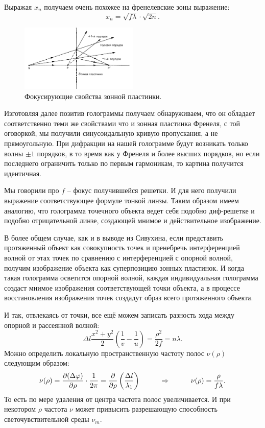 Выражая $x_n$ получаем очень похожее на френелевские зоны выражение:
 \begin{equation*}
 	x_n = \sqrt{f \lambda} \cdot \sqrt{2 n}.
 \end{equation*}

 \begin{figure}
     \centering
     \includegraphics[width=0.5\textwidth]{figures/vosstan_gabor.png}
     \caption{Фокусирующие свойства зонной пластинки.}
 \end{figure}
 Изготовляя далее позитив голограммы получаем обнаруживаем, что он обладает соответственно теми же свойствами что и зонная пластинка Френеля, с той оговоркой, мы получили синусоидальную кривую пропускания, а не прямоугольную. При дифракции на нашей голограмме будут возникать только волны $\pm 1$ порядков, в то время как у Френеля и более высших порядков, но если последнего ограничить только по первым гармоникам, то картина получится идентичная.

 Мы говорили про $f$ -- фокус получившейся решетки. И для него получили выражение соответствующее формуле тонкой линзы.
 Таким образом имеем аналогию, что голограмма точечного объекта ведет себя подобно диф-решетке и подобно отрицательной линзе, создающей мнимое и действительное изображение. 

В более общем случае, как и в выводе из Сивухина, если представить протяженный объект как совокупность точек и пренебречь интерференцией волной от этах точек по сравнению с интерференцией с опорной волной, получим изображение объекта как суперпозицию зонных пластинок. И когда такая голограмма осветится опорной волной, каждая индивидуальная голограмма создаст мнимое изображения соответствующей точки объекта, а в процессе восстановления изображения точек создадут образ всего протяженного объекта.

И так, отвлекаясь от точки, все ещё можем записать разность хода между опорной и рассеянной волной:
\begin{equation*}
	\Delta l \frac{x^2 + y^2}{2} \left(\frac{1}{v} - \frac{1}{u}\right) = \frac{\rho^2}{2 f} = n \lambda.
\end{equation*}
Можно определить локальную пространственную частоту полос $\nu(\rho)$ следующим образом:
\begin{equation*}
	\nu(\rho) = \frac{\partial (\Delta \varphi)}{\partial\rho} \cdot \frac{1}{2 \pi} = \frac{\partial}{\partial \rho} \left(\frac{\Delta l}{\lambda_1}\right)
	\hspace{1 cm}
	\Rightarrow
	\hspace{1 cm}
	\nu(\rho) = \frac{\rho}{f \lambda}.
\end{equation*}
То есть по мере удаления от центра частота полос увеличивается. И при некотором $\rho$ частота $\nu$ может привысить разрешающую способность светочувствительной среды $\nu_m$.


